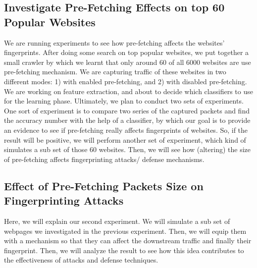 \documentclass{sig-alternate-05-2015}
\begin{document}
\subsection{Investigate Pre-Fetching Effects on top 60 Popular Websites}
We are running experiments to see how pre-fetching affects the websites' fingerprints.
After doing some search on top popular websites, we put together a small crawler by which we learnt that only around 60 of all 6000 websites are use pre-fetching mechanism. We are capturing traffic of these websites in two different modes: 1) with enabled pre-fetching, and 2) with disabled pre-fetching. We are working on feature extraction, and about to decide which classifiers to use for the learning phase.
Ultimately, we plan to conduct two sets of experiments. One sort of experiment is to compare two series of the captured packets and find the accuracy number with the help of a classifier, by which our goal is to provide an evidence to see if pre-fetching really affects fingerprints of websites. So, if the result will be positive, we will perform another set of experiment, which kind of simulates a sub set of those 60 websites. Then, we will see how (altering) the size of pre-fetching affects fingerprinting attacks/ defense mechanisms.


\subsection{Effect of Pre-Fetching Packets Size on Fingerprinting Attacks}
Here, we will explain our second experiment. We will simulate a sub set of webpages we investigated in the previous experiment. Then, we will equip them with a mechanism so that they can affect the downstream traffic and finally their fingerprint. Then, we will analyze the result to see how this idea contributes to the effectiveness of attacks and defense techniques.
%

\end{document}
